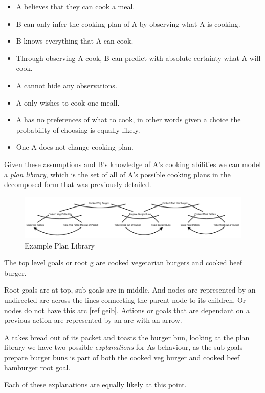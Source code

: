 \documentclass[parskip]{cs4rep}
\begin{document}
\begin{itemize}
\item
A believes that they can cook a meal.
\item
B can only infer the cooking plan of A by observing what A is cooking.
\item
B knows everything that A can cook.
\item
Through observing A cook, B can predict with absolute certainty what A will cook.
\item
A cannot hide any observations.
\item
A only wishes to cook one meall.
\item
A has no preferences of what to cook, in other words given a choice the probability of choosing is equally likely.
\item
One A does not change cooking plan.
\end{itemize}

Given these assumptions and B's knowledge of A's cooking abilities we can model a \textit{plan library}, which is the set of all of A's possible cooking plans in the decomposed form that was previously detailed.

\begin{figure}[h]
\centering
\includegraphics{images/example_plan_recognition}
\caption{Example Plan Library}
\label{fig:example_plan_library}
\end{figure}

The top level goals or root g are cooked vegetarian burgers and cooked beef burger. 

Root goals are at top, sub goals are in middle. And nodes are represented by an undirected arc across the lines connecting the parent node to its children, Or-nodes do not have this arc [ref geib]. Actions or goals that are dependant on a previous action are represented by an arc with an arrow.

A takes bread out of its packet and toasts the burger bun, looking at the plan library we have two possible \textit{explanations} for As behaviour, as the sub goals prepare burger buns is part of both the cooked veg burger and cooked beef hamburger root goal.

Each of these explanations are equally likely at this point.
\end{document}

